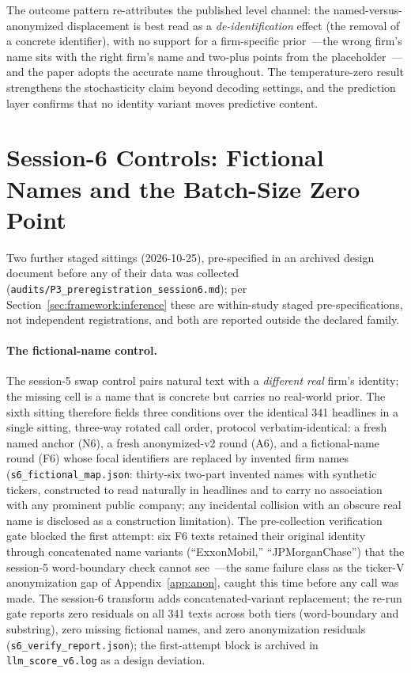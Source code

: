The outcome pattern re-attributes the published level channel: the named-versus-anonymized displacement is best read as a \emph{de-identification} effect (the removal of a concrete identifier), with no support for a firm-specific prior~---the wrong firm's name sits with the right firm's name and two-plus points from the placeholder~---and the paper adopts the accurate name throughout. The temperature-zero result strengthens the stochasticity claim beyond decoding settings, and the prediction layer confirms that no identity variant moves predictive content.


\section{Session-6 Controls: Fictional Names and the Batch-Size Zero Point}\label{app:session6}

Two further staged sittings (2026-10-25), pre-specified in an archived design document before any of their data was collected (\texttt{audits/P3\_preregistration\_session6.md}); per Section~\ref{sec:framework:inference} these are within-study staged pre-specifications, not independent registrations, and both are reported outside the declared family.

\paragraph{The fictional-name control.} The session-5 swap control pairs natural text with a \emph{different real} firm's identity; the missing cell is a name that is concrete but carries no real-world prior. The sixth sitting therefore fields three conditions over the identical 341 headlines in a single sitting, three-way rotated call order, protocol verbatim-identical: a fresh named anchor (N6), a fresh anonymized-v2 round (A6), and a fictional-name round (F6) whose focal identifiers are replaced by invented firm names (\texttt{s6\_fictional\_map.json}: thirty-six two-part invented names with synthetic tickers, constructed to read naturally in headlines and to carry no association with any prominent public company; any incidental collision with an obscure real name is disclosed as a construction limitation). The pre-collection verification gate blocked the first attempt: six F6 texts retained their original identity through concatenated name variants (``ExxonMobil,'' ``JPMorganChase'') that the session-5 word-boundary check cannot see~---the same failure class as the ticker-V anonymization gap of Appendix~\ref{app:anon}, caught this time before any call was made. The session-6 transform adds concatenated-variant replacement; the re-run gate reports zero residuals on all 341 texts across both tiers (word-boundary and substring), zero missing fictional names, and zero anonymization residuals (\texttt{s6\_verify\_report.json}); the first-attempt block is archived in \texttt{llm\_score\_v6.log} as a design deviation.

